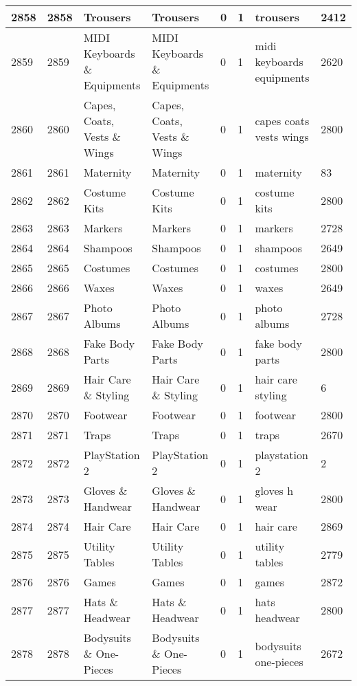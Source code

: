 \begin{longtable}{|l|l|l|l|l|l|l|l|}
2858 & 2858 & Trousers & Trousers & 0 & 1 & trousers & 2412 \\ \hline 
2859 & 2859 & MIDI Keyboards \& Equipments & MIDI Keyboards \& Equipments & 0 & 1 & midi keyboards equipments & 2620 \\ \hline 
2860 & 2860 & Capes, Coats, Vests \& Wings & Capes, Coats, Vests \& Wings & 0 & 1 & capes coats vests wings & 2800 \\ \hline 
2861 & 2861 & Maternity & Maternity & 0 & 1 & maternity & 83 \\ \hline 
2862 & 2862 & Costume Kits & Costume Kits & 0 & 1 & costume kits & 2800 \\ \hline 
2863 & 2863 & Markers & Markers & 0 & 1 & markers & 2728 \\ \hline 
2864 & 2864 & Shampoos & Shampoos & 0 & 1 & shampoos & 2649 \\ \hline 
2865 & 2865 & Costumes & Costumes & 0 & 1 & costumes & 2800 \\ \hline 
2866 & 2866 & Waxes & Waxes & 0 & 1 & waxes & 2649 \\ \hline 
2867 & 2867 & Photo Albums & Photo Albums & 0 & 1 & photo albums & 2728 \\ \hline 
2868 & 2868 & Fake Body Parts & Fake Body Parts & 0 & 1 & fake body parts & 2800 \\ \hline 
2869 & 2869 & Hair Care \& Styling & Hair Care \& Styling & 0 & 1 & hair care styling & 6 \\ \hline 
2870 & 2870 & Footwear & Footwear & 0 & 1 & footwear & 2800 \\ \hline 
2871 & 2871 & Traps & Traps & 0 & 1 & traps & 2670 \\ \hline 
2872 & 2872 & PlayStation 2 & PlayStation 2 & 0 & 1 & playstation 2 & 2 \\ \hline 
2873 & 2873 & Gloves \& Handwear & Gloves \& Handwear & 0 & 1 & gloves h wear & 2800 \\ \hline 
2874 & 2874 & Hair Care & Hair Care & 0 & 1 & hair care & 2869 \\ \hline 
2875 & 2875 & Utility Tables & Utility Tables & 0 & 1 & utility tables & 2779 \\ \hline 
2876 & 2876 & Games & Games & 0 & 1 & games & 2872 \\ \hline 
2877 & 2877 & Hats \& Headwear & Hats \& Headwear & 0 & 1 & hats headwear & 2800 \\ \hline 
2878 & 2878 & Bodysuits \& One-Pieces & Bodysuits \& One-Pieces & 0 & 1 & bodysuits one-pieces & 2672 \\ \hline 

\end{longtable}
